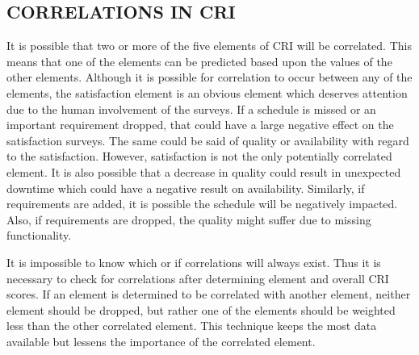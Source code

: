 \documentclass[SDSUThesis.tex]{subfiles}
\begin{document}
    \subsection{CORRELATIONS IN CRI}
        It is possible that two or more of the five elements of CRI will be correlated.  This means that
        one of the elements can be predicted based upon the values of the other elements.  Although
        it is possible for correlation to occur between any of the elements, the satisfaction element
        is an obvious element which deserves attention due to the human involvement of the surveys. 
        If a schedule is missed or an important requirement dropped, that could have a large negative
        effect on the satisfaction surveys.  The same could be said of quality or availability with regard to 
        the satisfaction.  However, satisfaction is not the only potentially correlated element.  It is also
        possible that a decrease in quality could result in unexpected downtime which could have a
        negative result on availability.  Similarly, if requirements are added, it is possible the schedule
        will be negatively impacted.  Also, if requirements are dropped, the quality might suffer due
        to missing functionality.  
        
        It is impossible to know which or if correlations will always exist.  Thus it is necessary to
        check for correlations after determining element and overall CRI scores.  
        If an element is determined to be correlated with another element, neither element should be dropped,
        but rather one of the elements should be weighted less than
        the other correlated element.  
        This technique keeps the most data available but lessens the importance of
        the correlated element. 
        
\end{document}
